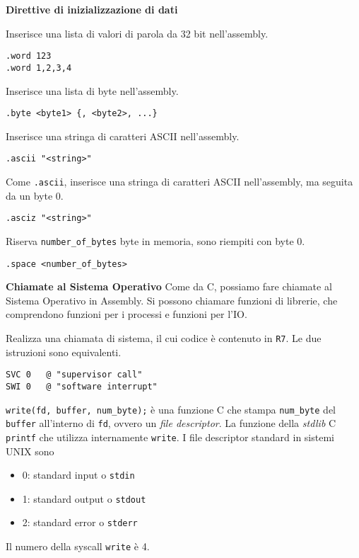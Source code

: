 \begin{defn}
\textbf{Direttive di inizializzazione di dati}

Inserisce una lista di valori di parola da 32 bit nell'assembly.
\begin{lstlisting}[style=arm]
.word 123
.word 1,2,3,4
\end{lstlisting}

Inserisce una lista di byte nell'assembly.
\begin{lstlisting}[style=arm]
.byte <byte1> {, <byte2>, ...}
\end{lstlisting}

Inserisce una stringa di caratteri ASCII nell'assembly.
\begin{lstlisting}[style=arm]
.ascii "<string>"
\end{lstlisting}

Come \verb|.ascii|, inserisce una stringa di caratteri ASCII nell'assembly, ma seguita da un byte 0.
\begin{lstlisting}[style=arm]
.asciz "<string>"
\end{lstlisting}

Riserva \verb|number_of_bytes| byte in memoria, sono riempiti con byte 0.
\begin{lstlisting}[style=arm]
.space <number_of_bytes>
\end{lstlisting}
\end{defn}

\begin{defn}
\textbf{Chiamate al Sistema Operativo}
Come da C, possiamo fare chiamate al Sistema Operativo in Assembly. Si possono chiamare funzioni di librerie, che comprendono funzioni per i processi e funzioni per l'IO.

Realizza una chiamata di sistema, il cui codice è contenuto in \verb|R7|. Le due istruzioni sono equivalenti.
\begin{lstlisting}[style=arm]
SVC 0	@ "supervisor call"
SWI 0	@ "software interrupt"
\end{lstlisting}
\end{defn}

\begin{exmp}
\verb|write(fd, buffer, num_byte);| è una funzione C che stampa \verb|num_byte| del \verb|buffer| all'interno di \verb|fd|, ovvero un \textit{file descriptor}. La funzione della \textit{stdlib} C \verb|printf| che utilizza internamente \verb|write|. I file descriptor standard in sistemi UNIX sono
\begin{itemize}
	\item 0: standard input o \verb|stdin|
	\item 1: standard output o \verb|stdout|
	\item 2: standard error o \verb|stderr|
\end{itemize}

Il numero della syscall \verb|write| è 4.
\end{exmp}

